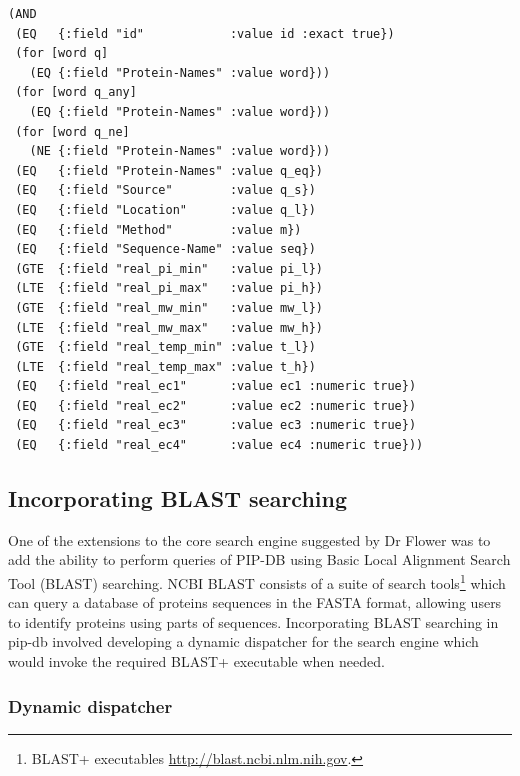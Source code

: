 \lstset{language=clojure}
\begin{lstlisting}[label=lst:query-tree,caption={%
      [Clojure implementation of the query tree]
      Implementation of the query tree in Clojure, from the file
      \texttt{query.clj}. Note the flat query hierarchy and the
      use of the \texttt{for} macro for expanding multivalued
      queries.}]
(AND
 (EQ   {:field "id"            :value id :exact true})
 (for [word q]
   (EQ {:field "Protein-Names" :value word}))
 (for [word q_any]
   (EQ {:field "Protein-Names" :value word}))
 (for [word q_ne]
   (NE {:field "Protein-Names" :value word}))
 (EQ   {:field "Protein-Names" :value q_eq})
 (EQ   {:field "Source"        :value q_s})
 (EQ   {:field "Location"      :value q_l})
 (EQ   {:field "Method"        :value m})
 (EQ   {:field "Sequence-Name" :value seq})
 (GTE  {:field "real_pi_min"   :value pi_l})
 (LTE  {:field "real_pi_max"   :value pi_h})
 (GTE  {:field "real_mw_min"   :value mw_l})
 (LTE  {:field "real_mw_max"   :value mw_h})
 (GTE  {:field "real_temp_min" :value t_l})
 (LTE  {:field "real_temp_max" :value t_h})
 (EQ   {:field "real_ec1"      :value ec1 :numeric true})
 (EQ   {:field "real_ec2"      :value ec2 :numeric true})
 (EQ   {:field "real_ec3"      :value ec3 :numeric true})
 (EQ   {:field "real_ec4"      :value ec4 :numeric true}))
\end{lstlisting}


\subsection{Incorporating BLAST searching}\label{subsec:blast-searching}

One of the extensions to the core search engine suggested by Dr Flower
was to add the ability to perform queries of PIP-DB using Basic Local
Alignment Search Tool (BLAST) searching. NCBI BLAST consists of a
suite of search tools\footnote{BLAST+ executables
  \url{http://blast.ncbi.nlm.nih.gov}.}
which can query a database of proteins sequences in the FASTA format,
allowing users to identify proteins using parts of
sequences. Incorporating BLAST searching in pip-db involved developing
a dynamic dispatcher for the search engine which would invoke the
required BLAST+ executable when needed.

\subsubsection*{Dynamic dispatcher}


